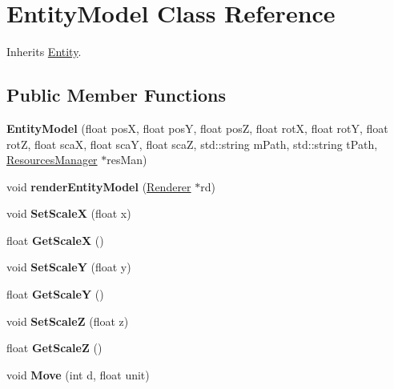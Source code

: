 \hypertarget{class_entity_model}{\section{Entity\-Model Class Reference}
\label{class_entity_model}
}


Inherits \hyperlink{class_entity}{Entity}.

\subsection*{Public Member Functions}
\begin{DoxyCompactItemize}
\item 
\hypertarget{class_entity_model_a58638118c3506ddf4daaa2b312582618}{{\bfseries Entity\-Model} (float pos\-X, float pos\-Y, float pos\-Z, float rot\-X, float rot\-Y, float rot\-Z, float sca\-X, float sca\-Y, float sca\-Z, std\-::string m\-Path, std\-::string t\-Path, \hyperlink{class_resources_manager}{Resources\-Manager} $\ast$res\-Man)}\label{class_entity_model_a58638118c3506ddf4daaa2b312582618}

\item 
\hypertarget{class_entity_model_af6cd7cf2febc5e17e08205b283cfb72b}{void {\bfseries render\-Entity\-Model} (\hyperlink{class_renderer}{Renderer} $\ast$rd)}\label{class_entity_model_af6cd7cf2febc5e17e08205b283cfb72b}

\item 
\hypertarget{class_entity_model_a413b2bc4db6e472672982bbe28962bf2}{void {\bfseries Set\-Scale\-X} (float x)}\label{class_entity_model_a413b2bc4db6e472672982bbe28962bf2}

\item 
\hypertarget{class_entity_model_aac39ccf2b12f8a63f27a6ffa2ffee9a2}{float {\bfseries Get\-Scale\-X} ()}\label{class_entity_model_aac39ccf2b12f8a63f27a6ffa2ffee9a2}

\item 
\hypertarget{class_entity_model_aa3eb6e49cd41eabefc99280ccb414af9}{void {\bfseries Set\-Scale\-Y} (float y)}\label{class_entity_model_aa3eb6e49cd41eabefc99280ccb414af9}

\item 
\hypertarget{class_entity_model_a982369e6e47959fd275c677546473fa2}{float {\bfseries Get\-Scale\-Y} ()}\label{class_entity_model_a982369e6e47959fd275c677546473fa2}

\item 
\hypertarget{class_entity_model_a0bb9038b6bfece059d5a43b7cc6781f0}{void {\bfseries Set\-Scale\-Z} (float z)}\label{class_entity_model_a0bb9038b6bfece059d5a43b7cc6781f0}

\item 
\hypertarget{class_entity_model_a1380ee58be0b3747f2c83cdd94cee31b}{float {\bfseries Get\-Scale\-Z} ()}\label{class_entity_model_a1380ee58be0b3747f2c83cdd94cee31b}

\item 
\hypertarget{class_entity_model_ab097a18440f08d0fa67e229f89b0a86c}{void {\bfseries Move} (int d, float unit)}\label{class_entity_model_ab097a18440f08d0fa67e229f89b0a86c}

\end{DoxyCompactItemize}
